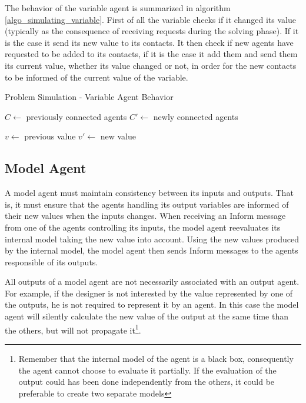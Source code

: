 The behavior of the variable agent is summarized in algorithm \ref{algo_simulating_variable}. First of all the variable checks if it changed its value (typically as the consequence of receiving requests during the solving phase). If it is the case it send its new value to its contacts. It then check if new agents have requested to be added to its contacts, if it is the case it add them and send them its current value, whether its value changed or not, in order for the new contacts to be informed of the current value of the variable.

\begin{algorithm}
\caption{Problem Simulation - Variable Agent Behavior}
\label{algo_simulating_variable}

	$C \leftarrow$ previously connected agents\;
	$C'\leftarrow$ newly connected agents\;
		
	$v \leftarrow$ previous value\;
	$v'\leftarrow$ new value\;
	
	
	
\end{algorithm}

\subsection{Model Agent}\label{simulation_model}

A model agent must maintain consistency between its inputs and outputs. That is, it must ensure that the agents handling its output variables are informed of their new values when the inputs changes. When receiving an Inform message from one of the agents controlling its inputs, the model agent reevaluates its internal model taking the new value into account. Using the new values produced by the internal model, the model agent then sends Inform messages to the agents responsible of its outputs.

All outputs of a model agent are not necessarily associated with an output agent. For example, if the designer is not interested by the value represented by one of the outputs, he is not required to represent it by an agent. In this case the model agent will silently calculate the new value of the output at the same time than the others, but will not propagate it\footnote{Remember that the internal model of the agent is a black box, consequently the agent cannot choose to evaluate it partially. If the evaluation of the output could has been done independently from the others, it could be preferable to create two separate models}.

